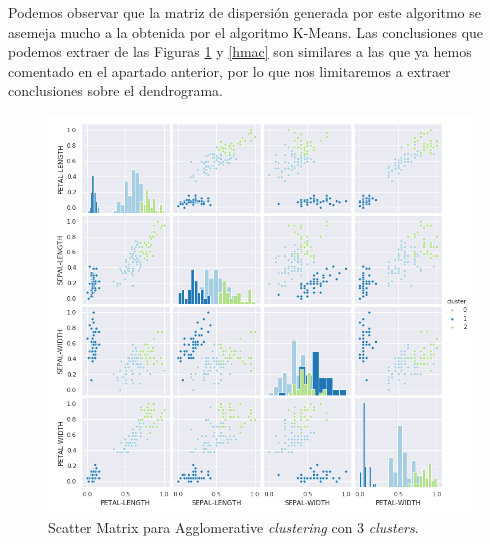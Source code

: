 \documentclass[a4paper, 20pt]{article}
\begin{document}
Podemos observar que la matriz de dispersión generada por este algoritmo se asemeja mucho a la obtenida por el algoritmo K-Means. Las conclusiones que podemos extraer de las Figuras \ref{smac} y \ref{hmac} son similares a las que ya hemos comentado en el apartado anterior, por lo que nos limitaremos a extraer conclusiones sobre el dendrograma.

\clearpage

\begin{figure}[h]
\centering
\includegraphics[scale=0.64]{dani/scatmatrixAggClusterIRIS.png}
\caption{Scatter Matrix para Agglomerative \textit{clustering} con 3 \textit{clusters}.}
\label{smac}
\end{figure}

\clearpage
\end{document}
